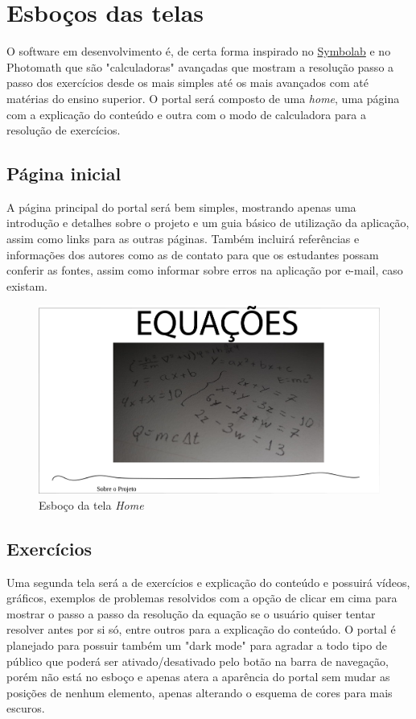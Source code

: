 \documentclass[12pt]{report}
\begin{document}
\chapter{Esboços das telas}
O software em desenvolvimento é, de certa forma inspirado no \href{https://pt.symbolab.com/}{Symbolab} e no Photomath que são "calculadoras" avançadas que mostram a resolução passo a passo dos exercícios desde os mais simples até os mais avançados com até matérias do ensino superior. O portal será composto de uma \textit{home}, uma página com a explicação do conteúdo e outra com o modo de calculadora para a resolução de exercícios.

\section{Página inicial}
A página principal do portal será bem simples, mostrando apenas uma introdução e detalhes sobre o projeto e um guia básico de utilização da aplicação, assim como links para as outras páginas. Também incluirá referências e informações dos autores como as de contato para que os estudantes possam conferir as fontes, assim como informar sobre erros na aplicação por e-mail, caso existam.

\begin{figure}[H]
    \includegraphics[width=1\textwidth]{img/c.png}
    \caption{Esboço da tela \textit{Home}}
\end{figure}

\section{Exercícios}
Uma segunda tela será a de exercícios e explicação do conteúdo e possuirá vídeos, gráficos, exemplos de problemas resolvidos com a opção de clicar em cima para mostrar o passo a passo da resolução da equação se o usuário quiser tentar resolver antes por si só, entre outros para a explicação do conteúdo. O portal é planejado para possuir também um "dark mode" para agradar a todo tipo de público que poderá ser ativado/desativado pelo botão na barra de navegação, porém não está no esboço e apenas atera a aparência do portal sem mudar as posições de nenhum elemento, apenas alterando o esquema de cores para mais escuros.
\end{document}
